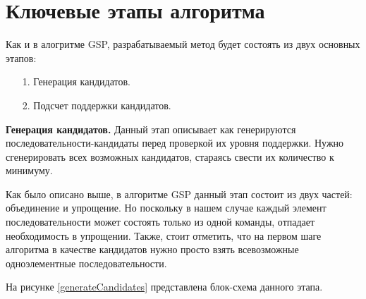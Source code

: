 
\section{Ключевые этапы алгоритма}
Как и в алогритме GSP, разрабатываемый метод будет состоять из двух основных этапов:

\begin{enumerate}
	\item[1.] Генерация кандидатов.
	\item[2.] Подсчет поддержки кандидатов.
\end{enumerate}

\textbf{Генерация кандидатов.}
Данный этап описывает как генерируются последовательности-кандидаты перед проверкой их уровня поддержки. Нужно сгенерировать всех возможных кандидатов, стараясь свести их количество к минимуму.

Как было описано выше, в алгоритме GSP данный этап состоит из двух частей: объединение и упрощение. Но поскольку в нашем случае каждый элемент последовательности может состоять только из одной команды, отпадает необходимость в упрощении. Также, стоит отметить, что на первом шаге алгоритма в качестве кандидатов нужно просто взять всевозможные одноэлементные последовательности.

На рисунке \ref{generateCandidates} представлена блок-схема данного этапа.

